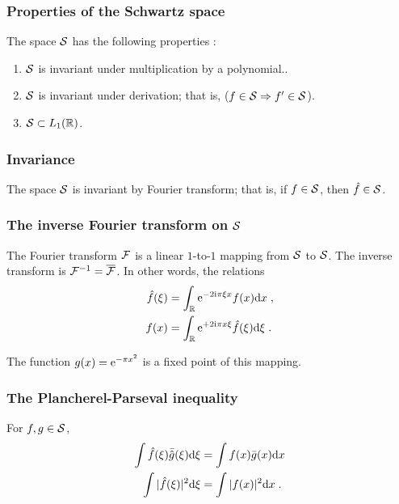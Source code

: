 \begin{frame}
\frametitle{Properties of the Schwartz space}
\begin{lemma}
The space $\mathcal{S}$ has the following properties :
\begin{enumerate}[label=(\roman*)]
\item $\mathcal{S}$ is invariant under multiplication by a polynomial..
\item $\mathcal{S}$  is invariant under derivation; that is, ($f \in \mathcal{S} \Rightarrow f' \in  \mathcal{S}$).
\item $\mathcal{S} \subset  L_1(\mathbb{R})$.
\end{enumerate}
\end{lemma}
\end{frame}



\begin{frame}
\frametitle{Invariance}
\begin{theorem}
The space $\mathcal{S}$ is invariant by Fourier transform; that is, if $f \in \mathcal{S}$, then $\hat{f} \in \mathcal{S}$.
\end{theorem}
\end{frame}


\begin{frame}
\frametitle{The inverse Fourier transform on $\mathcal{S}$}
\begin{theorem}\label{thm:Schwartz}
The Fourier transform $\mathcal{F}$ is a linear $1$-to-$1$ mapping from $\mathcal{S}$ to $\mathcal{S}$.
The inverse transform is $\mathcal{F}^{-1} = \overline{\mathcal{F}}$. In other words, the relations
\begin{align*}
\hat{f}(\xi) &= \int_{\mathbb{R}} \mathrm{e}^{-2 \mathrm{i} \pi \xi x} f(x) \mathrm{d} x \;, \\
f(x) &= \int_{\mathbb{R}} \mathrm{e}^{+ 2 \mathrm{i} \pi x \xi} \hat{f}(\xi) \mathrm{d} \xi \;.
\end{align*}
\end{theorem}
The function $g(x) = \mathrm{e}^{- \pi x^2}$ is a fixed point of this mapping.
\end{frame}

\begin{frame}
\frametitle{The Plancherel-Parseval inequality}
\begin{theorem}
For $f, g \in \mathcal{S}$, 
\begin{align*}
\int \hat{f}(\xi) \bar{\hat{g}}(\xi) \mathrm{d} \xi &= \int f(x) \bar{g}(x) \mathrm{d} x \\
\int |\hat{f}(\xi)|^2 \mathrm{d} \xi &= \int |f(x)|^2 \mathrm{d} x \;.
\end{align*}
\end{theorem}
\end{frame}


 